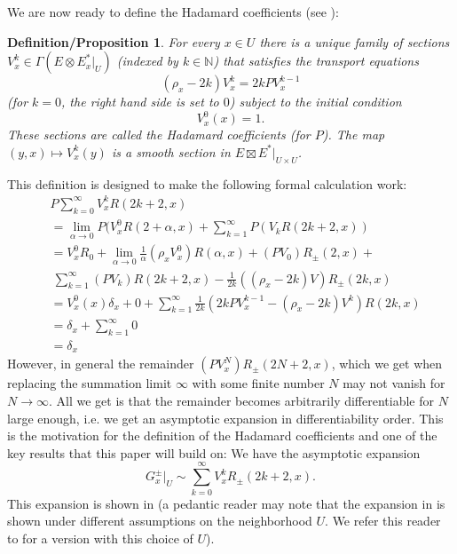 \documentclass[11pt]{article}
\def\N{{\mathbb{N}}}
\def\insum#1{\sum\limits_{#1=0}^\infty}
\newtheorem{defprop}[df]{Definition/Proposition}
\begin{document}
We are now ready to define the Hadamard coefficients (see \cite[Definition 2.2.1 and Proposition 2.3.1]{BGP}):
	\begin{defprop}
		\label{dfV}
		For every $x\in U$ there is a unique family of sections $V^{k}_x\in \Gamma(E\otimes E^*_x|_U)$ (indexed by $k\in \N$) that satisfies the transport equations 
		\[(\rho_x-2k) V^{k}_x=2kP V^{k-1}_x\]
		(for $k=0$, the right hand side is set to $0$) subject to the initial condition
		\[V^{0}_x(x)=1.\]
		These sections are called the Hadamard coefficients (for $P$). The map $(y,x)\mapsto V^{k}_x(y)$ is a smooth section in $E\boxtimes E^*|_{U\times U}$.
	\end{defprop}
This definition is designed to make the following formal calculation work:
\begin{align*}
	&P\insum{k}V^k_xR(2k+2,x)\\
	&=\lim\limits_{\alpha\rightarrow 0}P(V^0_xR(2+\alpha,x)+\sum\limits_{k=1}^\infty P(V_kR(2k+2,x))\\
	&=V^0_xR_0 +\lim\limits_{\alpha\rightarrow 0}\tfrac{1}{\alpha}(\rho_xV^0_x)R(\alpha,x) +(PV_0)R_\pm(2,x)+\\&\ \sum\limits_{k=1}^\infty (PV_k)R(2k+2,x)-\tfrac{1}{2k}((\rho_x-2k)V)R_\pm(2k,x)\\
	&=V^0_x(x)\delta_x+0+\sum\limits_{k=1}^\infty \tfrac{1}{2k}(2kPV^{k-1}_x-(\rho_x-2k) V^{k})R(2k,x)\\
	&=\delta_x+\sum\limits_{k=1}^\infty0\\
	&=\delta_x
\end{align*}
However, in general the remainder $(PV^{N}_x)R_\pm(2N+2,x)$, which we get when replacing the summation limit $\infty$ with some finite number $N$ may not vanish for $N\rightarrow \infty$. All we get is that the remainder becomes arbitrarily differentiable for $N$ large enough, i.e. we get an asymptotic expansion in differentiability order.
This is the motivation for the definition of the Hadamard coefficients and one of the key results that this paper will build on:
We have the asymptotic expansion
\[G^\pm_x|_U\sim\insum{k}V^{k}_xR_\pm(2k+2,x).\]
This expansion is shown in \cite [Proposition 2.5.1]{BGP} (a pedantic reader may note that the expansion in \cite{BGP} is shown under different assumptions on the neighborhood $U$. We refer this reader to \cite[Theorem 3.4]{Ron} for a version with this choice of $U$).
\end{document}
